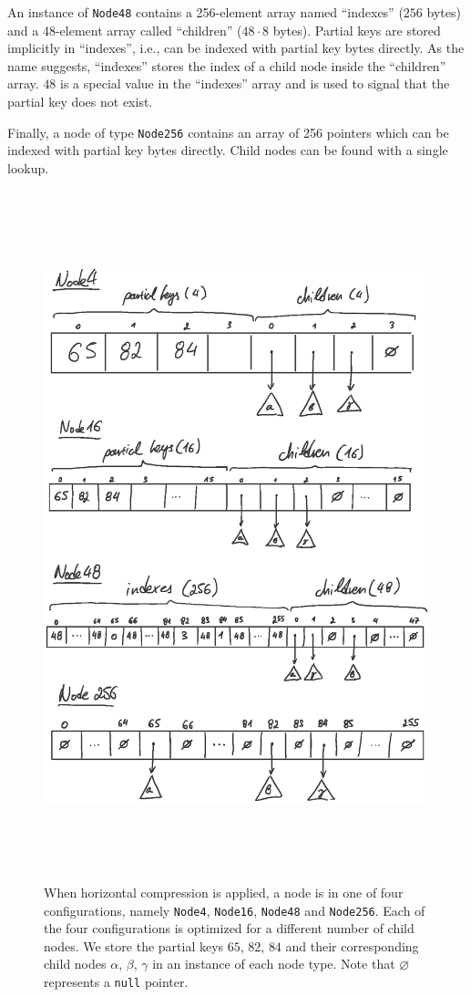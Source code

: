 \documentclass[abstracton,12pt]{scrartcl}
\theoremstyle{definition}
\begin{document}
An instance of \texttt{Node48} contains a 256-element array named 
``indexes'' ($256$ bytes) and a 48-element array called ``children''
($48 \cdot 8$ bytes).
Partial keys are stored implicitly in ``indexes'', i.e., 
can be indexed with partial key bytes directly.
As the name suggests, ``indexes'' stores the index of a child
node inside the ``children'' array. $48$ is a special value in the
``indexes'' array and is used to signal that the partial key
does not exist.

Finally, a node of type \texttt{Node256} contains an array of
256 pointers which can be indexed with partial key bytes directly.
Child nodes can be found with a single lookup.

\begin{figure}[H]
  \centering
  \includegraphics[height=20cm,trim={2.5cm 5cm 2.5cm 3.5cm},clip]{art_nodes_draw}
  \caption{
    When horizontal compression is applied, a node is in one of four 
    configurations, namely \texttt{Node4}, \texttt{Node16}, \texttt{Node48} 
    and \texttt{Node256}.
    Each of the four configurations is optimized for a different number of 
    child nodes. We store the partial keys $65$, $82$, $84$ and their 
    corresponding child nodes $\alpha$, $\beta$, $\gamma$ in an instance
    of each node type. Note that $\varnothing$ represents a \texttt{null} 
    pointer.
  }
 \label{fig:horizontal-compression}
\end{figure}
\end{document}
